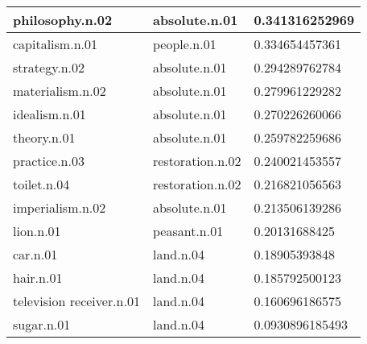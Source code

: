 \begin{center}
\begin{tabular}{ | l | l | l |}
philosophy.n.02 & absolute.n.01 & 0.341316252969\\ \hline
capitalism.n.01 & people.n.01 & 0.334654457361\\ \hline
strategy.n.02 & absolute.n.01 & 0.294289762784\\ \hline
materialism.n.02 & absolute.n.01 & 0.279961229282\\ \hline
idealism.n.01 & absolute.n.01 & 0.270226260066\\ \hline
theory.n.01 & absolute.n.01 & 0.259782259686\\ \hline
practice.n.03 & restoration.n.02 & 0.240021453557\\ \hline
toilet.n.04 & restoration.n.02 & 0.216821056563\\ \hline
imperialism.n.02 & absolute.n.01 & 0.213506139286\\ \hline
lion.n.01 & peasant.n.01 & 0.20131688425\\ \hline
car.n.01 & land.n.04 & 0.18905393848\\ \hline
hair.n.01 & land.n.04 & 0.185792500123\\ \hline
television receiver.n.01 & land.n.04 & 0.160696186575\\ \hline
sugar.n.01 & land.n.04 & 0.0930896185493\\ \hline
\end{tabular}
\end{center}